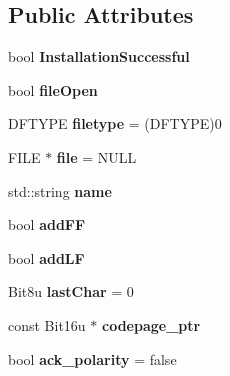 \subsection*{Public Attributes}
\begin{DoxyCompactItemize}
\item 
\hypertarget{classCFileLPT_a50011d4c71d93c858a22f2c76fee74a9}{bool {\bfseries Installation\-Successful}}\label{classCFileLPT_a50011d4c71d93c858a22f2c76fee74a9}

\item 
\hypertarget{classCFileLPT_ae1cefae0c35054232d464c238e7be32b}{bool {\bfseries file\-Open}}\label{classCFileLPT_ae1cefae0c35054232d464c238e7be32b}

\item 
\hypertarget{classCFileLPT_a9a234ae65d53bb0cd70965cf5b3311b3}{D\-F\-T\-Y\-P\-E {\bfseries filetype} = (D\-F\-T\-Y\-P\-E)0}\label{classCFileLPT_a9a234ae65d53bb0cd70965cf5b3311b3}

\item 
\hypertarget{classCFileLPT_a913fb933edd793303b09f8cfda162d38}{F\-I\-L\-E $\ast$ {\bfseries file} = N\-U\-L\-L}\label{classCFileLPT_a913fb933edd793303b09f8cfda162d38}

\item 
\hypertarget{classCFileLPT_ac10aaeb39fbc19ee51bf06e62715478e}{std\-::string {\bfseries name}}\label{classCFileLPT_ac10aaeb39fbc19ee51bf06e62715478e}

\item 
\hypertarget{classCFileLPT_a5a56af7c4b4073500a5bc432c6ef9f6f}{bool {\bfseries add\-F\-F}}\label{classCFileLPT_a5a56af7c4b4073500a5bc432c6ef9f6f}

\item 
\hypertarget{classCFileLPT_ae5562e8c41afa08c27270a36ae619f9d}{bool {\bfseries add\-L\-F}}\label{classCFileLPT_ae5562e8c41afa08c27270a36ae619f9d}

\item 
\hypertarget{classCFileLPT_a2151f7022055264e4c2e05cc8ba01c31}{Bit8u {\bfseries last\-Char} = 0}\label{classCFileLPT_a2151f7022055264e4c2e05cc8ba01c31}

\item 
\hypertarget{classCFileLPT_a3f6974f3af052e2c549e721ebcd93b48}{const Bit16u $\ast$ {\bfseries codepage\-\_\-ptr}}\label{classCFileLPT_a3f6974f3af052e2c549e721ebcd93b48}

\item 
\hypertarget{classCFileLPT_ab9f0f22206641224aa6178ff900543e0}{bool {\bfseries ack\-\_\-polarity} = false}\label{classCFileLPT_ab9f0f22206641224aa6178ff900543e0}


\end{DoxyCompactItemize}
